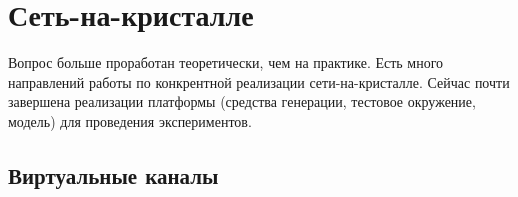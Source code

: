 
\chapter{Сеть-на-кристалле}

Вопрос больше проработан теоретически, чем на практике. Есть много направлений работы по конкрентной реализации сети-на-кристалле. Сейчас почти завершена реализации платформы (средства генерации, тестовое окружение, модель) для проведения экспериментов.

\section{Виртуальные каналы}

\clearpage

